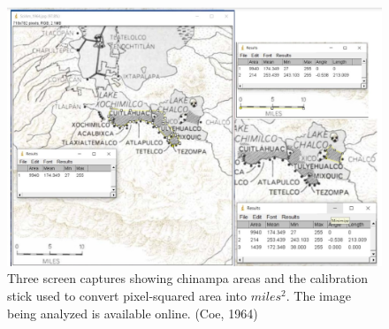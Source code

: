 \documentclass[11pt,letter]{article}
\begin{document}
\begin{figure}[ht!]
\centering
\includegraphics[width=\columnwidth]{imageJ_analysis.jpg}
\caption{
Three screen captures showing chinampa areas and the calibration stick used to convert pixel-squared area into $miles^2$.  The image being analyzed is available online. (Coe, 1964)
}
\label{imageJ}
\end{figure}
\end{document}
